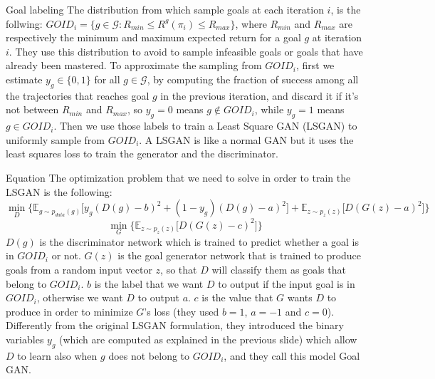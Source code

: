 \documentclass{beamer}
\begin{document}
	\begin{frame}{Goal labeling }
		The distribution from which sample goals at each iteration $i$, is the follwing: $GOID_i = \{ g \in \mathcal{G} \colon R_{min} \le R^g(\pi_i) \le R_{max}\}$, where $R_{min}$ and $R_{max}$ are respectively the minimum and maximum expected return for a goal $g$ at iteration $i$. They use this distribution to avoid to sample infeasible goals or goals that have already been mastered. To approximate the sampling from $GOID_i$, first we estimate $y_g\in \{0,1\}$ for all $g \in \mathcal{G}$, by computing the fraction of success among all the trajectories that reaches goal $g$ in the previous iteration, and discard it if it's not between $R_{min}$ and $R_{max}$, so $y_g = 0$ means $g \not\in GOID_i$, while $y_g = 1$ means $g \in GOID_i$. Then we use those labels to train a Least Square GAN (LSGAN) to uniformly sample from $GOID_i$. A LSGAN is like a normal GAN but it uses the least squares loss to train the generator and the discriminator.
	\end{frame}
	
	\begin{frame}{Equation}
		\footnotesize
		The optimization problem that we need to solve in order to train the LSGAN is the following:
		\scriptsize
		\begin{equation}
			\label{eq:1}
			\min_{D} \Big\{\mathbb{E}_{g \sim p_{data}(g)} \Big[y_g(D(g)-b)^2 + (1-y_g)(D(g)-a)^2\Big] + \mathbb{E}_{z \sim p_z(z)} \Big[D(G(z)-a)^2\Big] \Big\}
		\end{equation}
		\begin{equation}
			\label{eq:2}
			\min_G\Big\{ \mathbb{E}_{z \sim p_z(z)} \Big[D(G(z)-c)^2\Big] \Big\}
		\end{equation}
		\footnotesize
		 $D(g)$ is the discriminator network which is trained to predict whether a goal is in $GOID_i$ or not. $G(z)$ is the goal generator network that is trained to produce goals from a random input vector $z$, so that $D$ will classify them as goals that belong to $GOID_i$. $b$ is the label that we want $D$ to output if the input goal is in $GOID_i$, otherwise we want $D$ to output $a$. $c$ is the value that $G$ wants $D$ to produce in order to minimize $G$'s loss (they used $b=1$, $a=-1$ and $c=0$). Differently from the original LSGAN formulation, they introduced the binary variables $y_g$ (which are computed as explained in the previous slide) which allow $D$ to learn also when $g$ does not belong to $GOID_i$, and they call this model Goal GAN.
	\end{frame}
\end{document}
